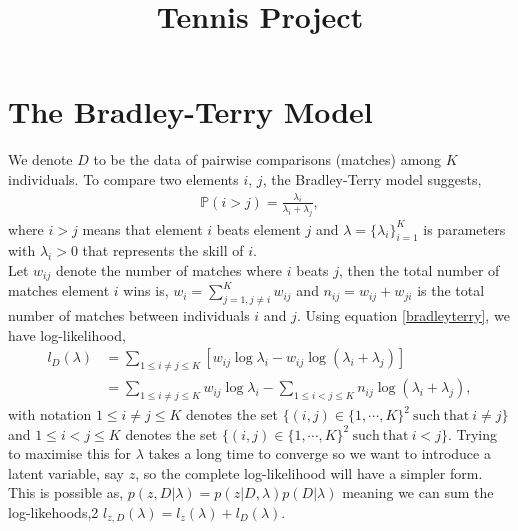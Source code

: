 \documentclass[11pt]{article}
\author{}
\title{Tennis Project}
\date{}
\numberwithin{equation}
{section}
\begin{document}
\maketitle

\section{The Bradley-Terry Model}

We denote $D$ to be the data of pairwise comparisons (matches) among $K$ individuals. To compare two elements $i$, $j$, the Bradley-Terry model suggests, 
\begin{align} \label{bradleyterry}
\mathbb{P}(i >j) = \frac{\lambda_i}{\lambda_i + \lambda_j},
\end{align} 
where $i>j$ means that element $i$ beats element $j$ and $\lambda = \{\lambda_i\}_{i=1}^K$ is parameters with $\lambda_i >0$ that represents the skill of $i$. \\

Let $w_{ij}$ denote the number of matches where $i$ beats $j$, then the total number of matches element $i$ wins is, $w_i = \sum_{j=1, j \neq i}^K w_{ij}$ and $n_{ij} = w_{ij}+w_{ji}$ is the total number of matches between individuals $i$ and $j$. Using equation \ref{bradleyterry}, we have log-likelihood, 
\begin{align}
l_D(\lambda) &= \sum _{1 \leq i\neq j \leq K} [w_{ij}\log\lambda_i - w_{ij}\log(\lambda_i+\lambda_j)] \\
&= \sum _{1 \leq i\neq j \leq K} w_{ij}\log\lambda_i - \sum _{1 \leq i< j \leq K} n_{ij}\log(\lambda_i+\lambda_j),
\end{align}
with notation $1 \leq i\neq j \leq K$ denotes the set $\{(i,j) \in \{1,\cdots, K\}^2 \ \mathrm{such \ that} \ i\neq j \}$ and $1 \leq i<j \leq K$ denotes the set $\{(i,j) \in \{1,\cdots, K\}^2 \ \mathrm{such \ that} \ i<j \}$. Trying to maximise this for $\lambda$  takes a long time to converge so we want to introduce a latent variable, say $z$, so the complete log-likelihood will have a simpler form. This is possible as, $p(z,D|\lambda) = p(z|D,\lambda)p(D|\lambda)$ meaning we can sum the log-likehoods,2 $l_{z,D}(\lambda) = l_z(\lambda) + l_D(\lambda)$.\\
\end{document}
